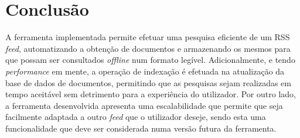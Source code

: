 \documentclass{article}
\begin{document}
\section{Conclusão}
A ferramenta implementada permite efetuar uma pesquisa eficiente de um RSS \textit{feed}, automatizando a obtenção de documentos e armazenando os mesmos para que 
possam ser consultados \textit{offline} num formato legível. Adicionalmente, e tendo \textit{performance} em mente, a operação de indexação é efetuada na atualização 
da base de dados de documentos, permitindo que as pesquisas sejam realizadas em tempo aceitável sem detrimento para a experiência do utilizador.
Por outro lado, a ferramenta desenvolvida apresenta uma escalabilidade que permite que seja facilmente adaptada a outro \textit{feed} que o utilizador deseje, sendo
esta uma funcionalidade que deve ser considerada numa versão futura da ferramenta. 
\end{document}
